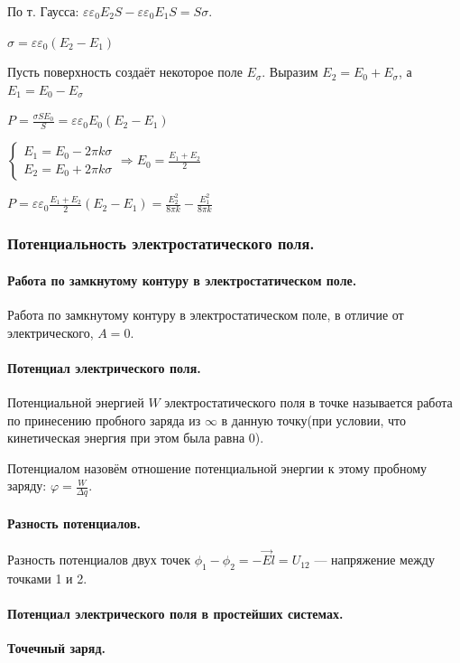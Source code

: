 \documentclass{article}
\begin{document}
                По т. Гаусса: \(\varepsilon\varepsilon_0 E_2 S - \varepsilon\varepsilon_0 E_1 S = S\sigma\).
                
                \(\sigma = \varepsilon\varepsilon_0(E_2 - E_1)\)

                Пусть поверхность создаёт некоторое поле \(E_\sigma\). Выразим \(E_2 = E_0 + E_\sigma\), а \(E_1 = E_0 - E_\sigma\)

                \(P = \frac{\sigma S E_0}{S} = \varepsilon\varepsilon_0 E_0(E_2 - E_1)\)

                \(\begin{cases}
                        E_1 = E_0 - 2\pi k \sigma\\
                        E_2 = E_0 + 2\pi k \sigma
                    \end{cases} \Rightarrow E_0 = \frac{E_1+E_2}{2}\)

                \(P = \varepsilon\varepsilon_0 \frac{E_1 + E_2}{2}(E_2 - E_1) = \frac{E_2^2}{8\pi k} - \frac{E_1^2}{8\pi k}\)
        \subsubsection{Потенциальность электростатического поля.}
            \paragraph{Работа по замкнутому контуру в электростатическом поле.}
                Работа по замкнутому контуру в электростатическом поле, в отличие от электрического, \(A = 0\).
            \paragraph{Потенциал электрического поля.}
                Потенциальной энергией \(W\) электростатического поля в точке называется работа по принесению пробного заряда из \(\infty\) в данную точку(при условии, что кинетическая энергия при этом была равна \(0\)).

                Потенциалом назовём отношение потенциальной энергии к этому пробному заряду: \(\varphi = \frac{W}{\Delta q}\).
            \paragraph{Разность потенциалов.}
                Разность потенциалов двух точек \(\phi_1 - \phi_2 = -\vec E l = U_{12}\) --- напряжение между точками 1 и 2.
            \paragraph{Потенциал электрического поля в простейших системах.}
                \textbf{Точечный заряд.}
                
\end{document}
